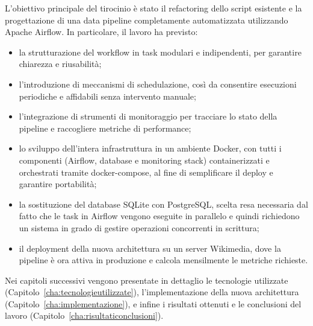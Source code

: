 L’obiettivo principale del tirocinio è stato il refactoring dello script esistente e la progettazione di una data pipeline completamente automatizzata utilizzando Apache Airflow. In particolare, il lavoro ha previsto:

\begin{itemize}
\item la strutturazione del workflow in task modulari e indipendenti, per garantire chiarezza e riusabilità;
\item l’introduzione di meccanismi di schedulazione, così da consentire esecuzioni periodiche e affidabili senza intervento manuale;
\item l’integrazione di strumenti di monitoraggio per tracciare lo stato della pipeline e raccogliere metriche di performance;
\item lo sviluppo dell’intera infrastruttura in un ambiente Docker, con tutti i componenti (Airflow, database e monitoring stack) containerizzati e orchestrati tramite docker-compose, al fine di semplificare il deploy e garantire portabilità;
\item la sostituzione del database SQLite con PostgreSQL, scelta resa necessaria dal fatto che le task in Airflow vengono eseguite in parallelo e quindi richiedono un sistema in grado di gestire operazioni concorrenti in scrittura;
\item il deployment della nuova architettura su un server Wikimedia, dove la pipeline è ora attiva in produzione e calcola mensilmente le metriche richieste.
\end{itemize}

Nei capitoli successivi vengono presentate in dettaglio le tecnologie utilizzate (Capitolo~\ref{cha:tecnologieutilizzate}), l’implementazione della nuova architettura (Capitolo~\ref{cha:implementazione}), e infine i risultati ottenuti e le conclusioni del lavoro (Capitolo~\ref{cha:risultaticonclusioni}).

\clearpage